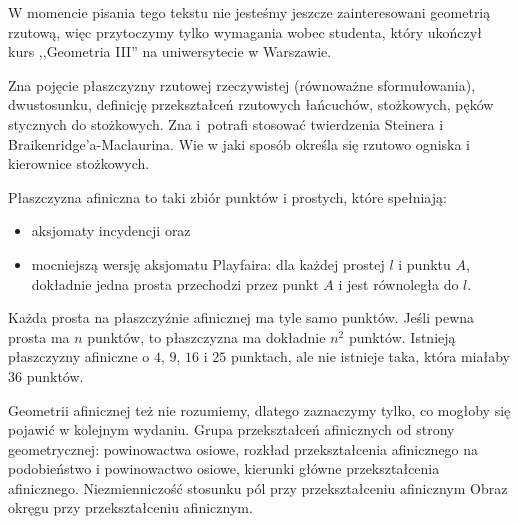 W momencie pisania tego tekstu nie jesteśmy jeszcze zainteresowani geometrią rzutową, więc przytoczymy tylko wymagania wobec studenta, który ukończył kurs ,,Geometria III'' na uniwersytecie w Warszawie.

Zna pojęcie płaszczyzny rzutowej rzeczywistej (równoważne sformułowania), dwustosunku, definicję przekształceń rzutowych łańcuchów, stożkowych, pęków stycznych do stożkowych.
%
%
%
Zna i~potrafi stosować twierdzenia Steinera i Braikenridge'a-Maclaurina.
%
%
Wie w jaki sposób określa się rzutowo ogniska i kierownice stożkowych.
%
%

\begin{proposition}
    Płaszczyzna afiniczna to taki zbiór punktów i prostych, które spełniają:
    \begin{itemize}
        \item aksjomaty incydencji oraz
        \item mocniejszą wersję aksjomatu Playfaira: dla każdej prostej $l$ i punktu $A$, dokładnie jedna prosta przechodzi przez punkt $A$ i jest równoległa do $l$.
    \end{itemize}
    Każda prosta na płaszczyźnie afinicznej ma tyle samo punktów.
    Jeśli pewna prosta ma $n$ punktów, to płaszczyzna ma dokładnie $n^2$ punktów.
    Istnieją płaszczyzny afiniczne o $4$, $9$, $16$ i $25$ punktach, ale nie istnieje taka, która miałaby $36$ punktów.
\end{proposition} %

Geometrii afinicznej też nie rozumiemy, dlatego zaznaczymy tylko, co mogłoby się pojawić w kolejnym wydaniu.
Grupa przekształceń afinicznych od strony geometrycznej: powinowactwa osiowe, rozkład przekształcenia afinicznego na podobieństwo i powinowactwo osiowe, kierunki główne przekształcenia afinicznego.
Niezmienniczość stosunku pól przy przekształceniu afinicznym
Obraz okręgu przy przekształceniu afinicznym.

%